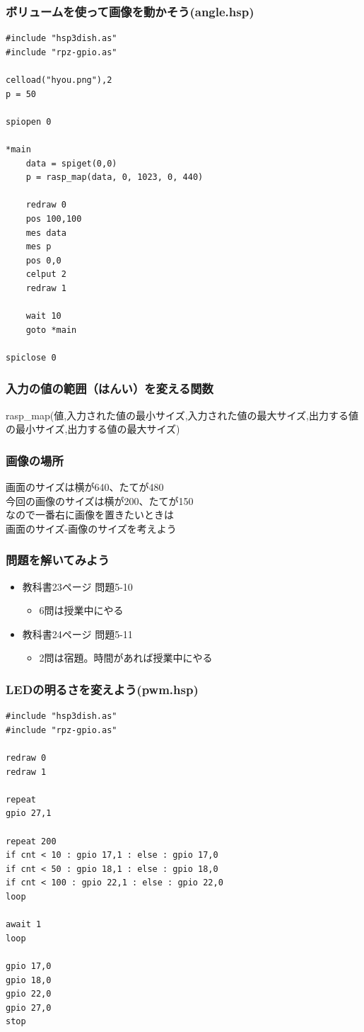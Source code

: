 \begin{frame}[fragile]
    \frametitle{ボリュームを使って画像を動かそう(angle.hsp)}
\begin{lstlisting}
#include "hsp3dish.as"
#include "rpz-gpio.as"

celload("hyou.png"),2
p = 50

spiopen 0

*main
	data = spiget(0,0)
	p = rasp_map(data, 0, 1023, 0, 440)

	redraw 0
	pos 100,100
	mes data
	mes p
	pos 0,0
	celput 2
	redraw 1

	wait 10	
	goto *main

spiclose 0
\end{lstlisting}
\end{frame}

\begin{frame}[fragile]
    \frametitle{入力の値の範囲（はんい）を変える関数}
    {rasp\_map(値,入力された値の最小サイズ,入力された値の最大サイズ,出力する値の最小サイズ,出力する値の最大サイズ)}
\end{frame}

\begin{frame}[fragile]
    \frametitle{画像の場所}
    {画面のサイズは横が640、たてが480\\
    今回の画像のサイズは横が200、たてが150\\
    なので一番右に画像を置きたいときは \\
    画面のサイズ-画像のサイズを考えよう}
\end{frame}

\begin{frame}[fragile]
    \frametitle{問題を解いてみよう}
    \begin{itemize}
        \item 教科書23ページ 問題5-10
        \begin{itemize}
            \item 6問は授業中にやる
        \end{itemize}
        \item 教科書24ページ 問題5-11
        \begin{itemize}
            \item 2問は宿題。時間があれば授業中にやる
        \end{itemize}
    \end{itemize}
\end{frame}

\begin{frame}[fragile]
    \frametitle{LEDの明るさを変えよう(pwm.hsp)}
\begin{lstlisting}
#include "hsp3dish.as"
#include "rpz-gpio.as"

redraw 0
redraw 1

repeat
gpio 27,1

repeat 200
if cnt < 10 : gpio 17,1 : else : gpio 17,0
if cnt < 50 : gpio 18,1 : else : gpio 18,0
if cnt < 100 : gpio 22,1 : else : gpio 22,0
loop

await 1
loop

gpio 17,0
gpio 18,0
gpio 22,0
gpio 27,0
stop
\end{lstlisting}
\end{frame}

